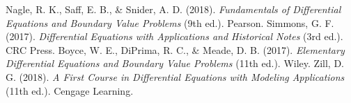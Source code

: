 \documentclass[12pt, letterpaper]{book}
\begin{document}
\backmatter %
% 

\begin{thebibliography}{9}
     Nagle, R. K., Saff, E. B., \& Snider, A. D. (2018). \textit{Fundamentals of Differential Equations and Boundary Value Problems} (9th ed.). Pearson.
     Simmons, G. F. (2017). \textit{Differential Equations with Applications and Historical Notes} (3rd ed.). CRC Press.
     Boyce, W. E., DiPrima, R. C., \& Meade, D. B. (2017). \textit{Elementary Differential Equations and Boundary Value Problems} (11th ed.). Wiley.
     Zill, D. G. (2018). \textit{A First Course in Differential Equations with Modeling Applications} (11th ed.). Cengage Learning.
\end{thebibliography}
\end{document}
